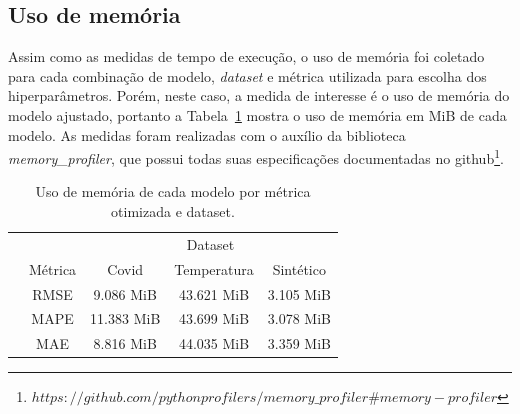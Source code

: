 \FloatBarrier

\subsection{Uso de memória}
Assim como as medidas de tempo de execução, o uso de memória foi coletado para cada combinação de modelo, \textit{dataset} e métrica utilizada para escolha dos hiperparâmetros. Porém, neste caso, a medida de interesse é o uso de memória do modelo ajustado, portanto a Tabela~\ref{tab:memoria} mostra o uso de memória em MiB de cada modelo. As medidas foram realizadas com o auxílio da biblioteca \textit{memory\_profiler}, que possui todas suas especificações documentadas no github\footnote{$https://github.com/pythonprofilers/memory\_profiler\#memory-profiler$}.


\begin{table}[!htp]
    \caption{Uso de memória de cada modelo por métrica otimizada e dataset.}
    \label{tab:memoria}
    \setlength\extrarowheight{5pt}
    \centering
    \begin{tabular}{|c|c|ccc|}
        \hline
        \rowcolor[HTML]{C0C0C0}
        \cellcolor[HTML]{C0C0C0}                          & \cellcolor[HTML]{C0C0C0}                          & \multicolumn{3}{c|}{\cellcolor[HTML]{C0C0C0}Dataset}                                                                                                   \\ \cline{3-5}
        \rowcolor[HTML]{C0C0C0}
        \multirow{-2}{*}{\cellcolor[HTML]{C0C0C0}Modelo}  & \multirow{-2}{*}{\cellcolor[HTML]{C0C0C0}Métrica} & \multicolumn{1}{c|}{\cellcolor[HTML]{C0C0C0}Covid}              & \multicolumn{1}{c|}{\cellcolor[HTML]{C0C0C0}Temperatura}        & Sintético          \\ \hline
        \cellcolor[HTML]{C0C0C0}                          & RMSE                                              & \multicolumn{1}{c|}{9.086 MiB}                                  & \multicolumn{1}{c|}{43.621 MiB}                                 & 3.105 MiB          \\ \cline{2-5}
        \rowcolor[HTML]{EFEFEF}
        \cellcolor[HTML]{C0C0C0}                          & MAPE                                              & \multicolumn{1}{c|}{\cellcolor[HTML]{EFEFEF}11.383 MiB}         & \multicolumn{1}{c|}{\cellcolor[HTML]{EFEFEF}43.699 MiB}         & 3.078 MiB          \\ \cline{2-5}
        \cellcolor[HTML]{C0C0C0}                          & MAE                                               & \multicolumn{1}{c|}{8.816 MiB}                                  & \multicolumn{1}{c|}{44.035 MiB}                                 & 3.359 MiB          \\ \cline{2-5}

\end{tabular}
\end{table}
